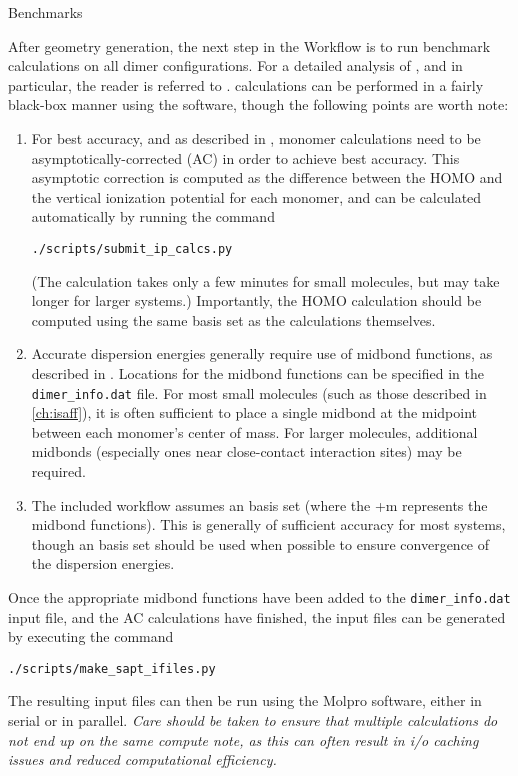 
\begin{section}{\sapt Benchmarks}
\label{sec:workflow-sapt}

After geometry generation, the next step 
in the Workflow
is to run benchmark \dftsapt calculations on all dimer configurations.
For a detailed analysis of \sapt, and \dftsapt in particular, the reader is
referred to 
.
\dftsapt calculations can be performed in a fairly black-box
manner using the \molpro software, though the following points are worth note:
\begin{enumerate}
\item For best accuracy, and as described in , monomer \dft
calculations need to be asymptotically-corrected (AC) in order to achieve best accuracy. This
asymptotic correction is computed as the difference between the HOMO and the
vertical ionization potential for each monomer, and can be calculated
automatically by running the command 
\begin{lstlisting}
./scripts/submit_ip_calcs.py
\end{lstlisting}
(The calculation takes only a few minutes for small molecules, but may take
longer for larger systems.) Importantly, the HOMO calculation should be computed
using the same basis set as the \dftsapt calculations themselves.
\item Accurate \sapt dispersion energies generally require use of midbond
functions, as described in . Locations for the midbond functions
can be specified in the \verb|dimer_info.dat| file. For most small molecules
(such as those described in \cref{ch:isaff}), it is
often sufficient to place a single midbond at the midpoint between each
monomer's center of mass. For larger molecules, additional midbonds
(especially ones near close-contact interaction sites) may be required.
\item The included workflow assumes an \avtzm basis set (where the +m represents
the midbond functions). This is generally of sufficient accuracy for most
systems, though an \avqzm basis set should be used when possible to ensure
convergence of the \dftsapt dispersion energies.
\end{enumerate}

Once the appropriate midbond functions have been added to the
\verb|dimer_info.dat| input file, and the AC calculations have finished, the
\dftsapt input files can be generated by executing the command

\begin{lstlisting}
./scripts/make_sapt_ifiles.py
\end{lstlisting}

The resulting input files can then be run using the Molpro software, either in
serial or in parallel. \emph{Care should be taken to ensure that multiple
calculations do not end up on the same compute note, as this can often result
in i/o caching issues and reduced computational efficiency.}

\end{section}
